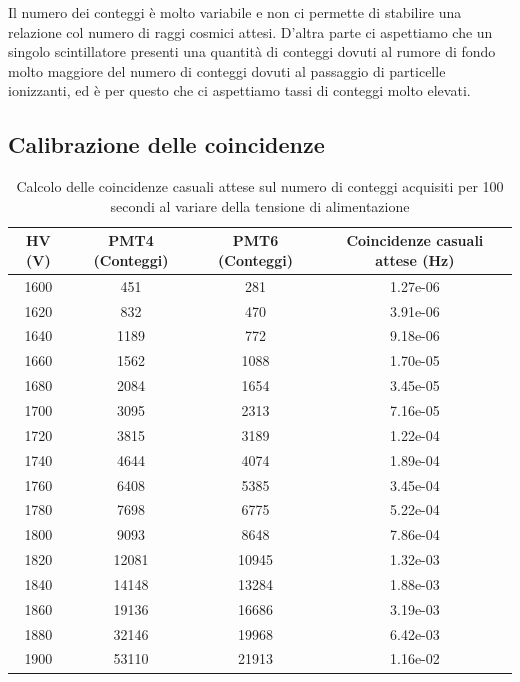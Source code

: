 \documentclass[a4paper,10pt]{article}
\begin{document}
Il numero dei conteggi è molto variabile e non ci permette di stabilire una relazione col numero di raggi cosmici attesi. D'altra parte ci aspettiamo che un singolo scintillatore presenti una quantità di conteggi dovuti al rumore di fondo molto maggiore del numero di conteggi dovuti al passaggio di particelle ionizzanti, ed è per questo che ci aspettiamo tassi di conteggi molto elevati.

\subsection{Calibrazione delle coincidenze}
\begin{table}
\centering
\begin{tabular}{|c|c|c|c|}
\hline
\textbf{HV (V)} & \textbf{PMT4 (Conteggi)} & \textbf{PMT6 (Conteggi)} & \textbf{Coincidenze casuali attese (Hz)} \\
\hline 
1600 & 451 & 281 & 1.27e-06 \\
\hline
1620 & 832 & 470 & 3.91e-06 \\
\hline
1640 & 1189 & 772 & 9.18e-06 \\
\hline
1660 & 1562 & 1088 & 1.70e-05 \\
\hline
1680 & 2084 & 1654 & 3.45e-05 \\
\hline
1700 & 3095 & 2313 & 7.16e-05 \\
\hline
1720 & 3815 & 3189 & 1.22e-04 \\
\hline
1740 & 4644 & 4074 & 1.89e-04 \\
\hline
1760 & 6408 & 5385 & 3.45e-04 \\
\hline
1780 & 7698 & 6775 & 5.22e-04 \\
\hline
1800 & 9093 & 8648 & 7.86e-04 \\
\hline
1820 & 12081 & 10945 & 1.32e-03 \\
\hline
1840 & 14148 & 13284 & 1.88e-03 \\
\hline
1860 & 19136 & 16686 & 3.19e-03 \\
\hline
1880 & 32146 & 19968 & 6.42e-03 \\
\hline
1900 & 53110 & 21913 & 1.16e-02 \\
\hline

\end{tabular} 
\caption{Calcolo delle coincidenze casuali attese sul numero di conteggi acquisiti per 100 secondi al variare della tensione di alimentazione}
\label{tab:random_coincidence}
\end{table}
\end{document}
